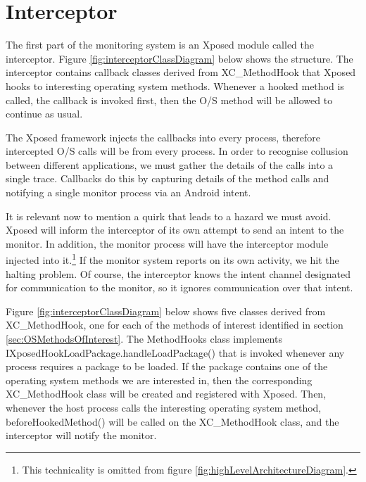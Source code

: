 \FloatBarrier

\section{Interceptor}
\label{sec:Interceptor}

The first part of the monitoring system is an Xposed module called the interceptor.  Figure \ref{fig:interceptorClassDiagram} below shows the structure.  The interceptor contains callback classes derived from XC\_MethodHook that Xposed hooks to interesting operating system methods.  Whenever a hooked method is called, the callback is invoked first, then the O/S method will be allowed to continue as usual.

The Xposed framework injects the callbacks into every process, therefore intercepted O/S calls will be from every process.  In order to recognise collusion between different applications, we must gather the details of the calls into a single trace.  Callbacks do this by capturing details of the method calls and notifying a single monitor process via an Android intent.

It is relevant now to mention a quirk that leads to a hazard we must avoid.  Xposed will inform the interceptor of its own attempt to send an intent to the monitor.  In addition, the monitor process will have the interceptor module injected into it.\footnote{This technicality is omitted from figure \ref{fig:highLevelArchitectureDiagram}.}  If the monitor system reports on its own activity, we hit the halting problem.  Of course, the interceptor knows the intent channel designated for communication to the monitor, so it ignores communication over that intent. 

Figure \ref{fig:interceptorClassDiagram} below shows five classes derived from XC\_MethodHook, one for each of the methods of interest identified in section \ref{sec:OSMethodsOfInterest}.  The MethodHooks class implements IXposedHookLoadPackage.handleLoadPackage() that is invoked whenever any process requires a package to be loaded.  If the package contains one of the operating system methods we are interested in, then the corresponding XC\_MethodHook class will be created and registered with Xposed.  Then, whenever the host process calls the interesting operating system method, beforeHookedMethod() will be called on the XC\_MethodHook class, and the interceptor will notify the monitor.

